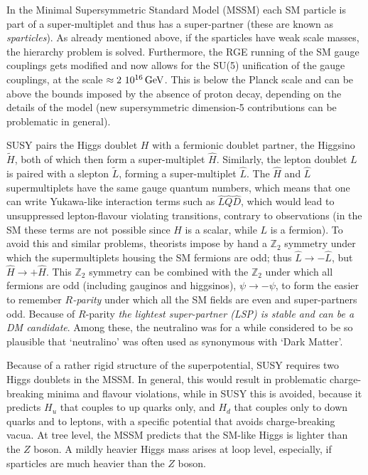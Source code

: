 \smallskip

In the Minimal Supersymmetric Standard Model (MSSM) each SM particle is part of a super-multiplet and thus has a super-partner (these are known as {\em sparticles}).
As already mentioned above, if the sparticles have weak scale masses, the hierarchy problem is solved. Furthermore,
the RGE running of the SM gauge couplings gets modified and now allows for the SU(5) unification of the gauge couplings, at the scale
$\approx 2~10^{16}\,{\rm GeV}$. This is below the Planck scale and can be above the bounds imposed by the absence of proton decay, depending on the details of the model (new supersymmetric dimension-5 contributions can be problematic in general).

\smallskip


SUSY pairs the Higgs doublet $H$ with a fermionic doublet partner, the Higgsino $\tilde H$, both of which then form a super-multiplet $\hat H$.
Similarly, the lepton doublet $L$ is paired with a slepton $\tilde{L}$, forming a super-multiplet $\hat L$.
The $\hat H$ and $\hat L$ supermultiplets have the same gauge quantum numbers, which means that one can write Yukawa-like interaction terms such as $\hat L \hat Q \hat D$, which would lead to  
unsuppressed lepton-flavour violating transitions, contrary to observations (in the SM these terms are not possible since $H$ is a scalar, while $L$ is a fermion). 
To avoid this and similar problems, theorists impose
by hand a $\mathbb{Z}_2$ symmetry under which the supermultiplets housing the SM fermions are odd; thus
$\hat{L}\to - \hat{L}$, but $\hat{H}\to+ \hat{H}$. This $\mathbb{Z}_2$ symmetry can be combined with the $\mathbb{Z}_2$ under which all fermions are odd (including gauginos and higgsinos), $\psi\to -\psi$, to form the easier to remember  {\em $R$-parity} under which all the SM fields are even and super-partners odd. 
Because of $R$-parity {\em the lightest super-partner (LSP) is stable and can be a DM candidate}. 
Among these, the neutralino was for a while considered to be so plausible 
that `neutralino' was often used as synonymous with `Dark Matter'. 

\smallskip

Because of a rather rigid structure of the superpotential, SUSY requires two Higgs doublets in the MSSM. In general, this would result in problematic 
charge-breaking minima and flavour violations, while in SUSY this is avoided, because it predicts 
$H_{u}$  that couples  to up quarks only, 
and $H_{d}$ that couples only to down quarks and to leptons, 
with a specific potential that avoids charge-breaking vacua.
At tree level, the MSSM predicts that the SM-like Higgs is  lighter than the $Z$ boson. 
A mildly heavier Higgs mass arises at loop level,
especially, if sparticles are much heavier than the $Z$ boson.

